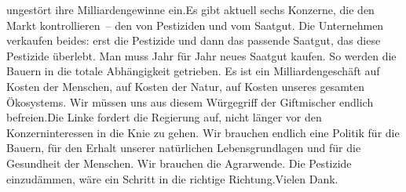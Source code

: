 \documentclass{article}
\begin{document}
ungestört ihre Milliardengewinne ein.Es gibt aktuell sechs Konzerne, die den Markt kontrollieren – den von Pestiziden und vom Saatgut. Die Unternehmen verkaufen beides: erst die Pestizide und dann das passende Saatgut, das diese Pestizide überlebt. Man muss Jahr für Jahr neues Saatgut kaufen. So werden die Bauern in die totale Abhängigkeit getrieben. Es ist ein Milliardengeschäft auf Kosten der Menschen, auf Kosten der Natur, auf Kosten unseres gesamten Ökosystems. Wir müssen uns aus diesem Würgegriff der Giftmischer endlich befreien.Die Linke fordert die Regierung auf, nicht länger vor den Konzerninteressen in die Knie zu gehen. Wir brauchen endlich eine Politik für die Bauern, für den Erhalt unserer natürlichen Lebensgrundlagen und für die Gesundheit der Menschen. Wir brauchen die Agrarwende. Die Pestizide einzudämmen, wäre ein Schritt in die richtige Richtung.Vielen Dank.
\end{document}
